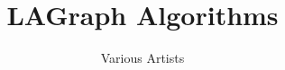 \documentclass{article}
\begin{document}
\title{LAGraph Algorithms}

\author{Various Artists}

\maketitle

\begin{abstract}

\end{abstract}








%

\clearpage



\end{document}
